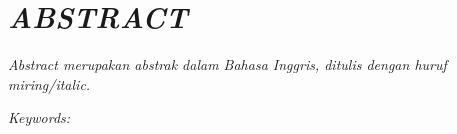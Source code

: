 \begingroup
\singlespacing

\chapter*{\itshape ABSTRACT}

\noindent
\textit{Abstract merupakan abstrak dalam Bahasa Inggris, ditulis
dengan huruf miring/italic.}

\vspace{1em}
\noindent \textit{Keywords: \Keywords}

\clearpage
\endgroup
